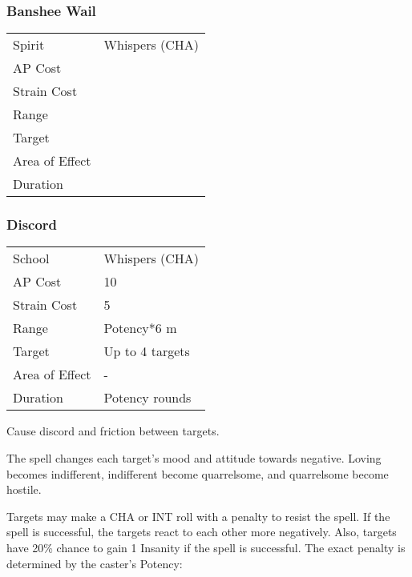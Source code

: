 \documentclass[11pt,a4paper,twocolumn]{book}
\begin{document}
\medskip

\subsubsection*{Banshee Wail}
{
	\begin{tabu} to 70mm{| X[l,4] | X[l,7] |}
		\hline
		Spirit         & Whispers (CHA) \\
		AP Cost        &                \\
		Strain Cost    &                \\
		Range          &                \\
		Target         &                \\
		Area of Effect &                \\
		Duration       &                \\ \hline
	\end{tabu}
	
}
\medskip


\subsubsection*{Discord}
{
	\begin{tabu} to 75mm{| X[l,4] | X[l,7] |}
		\hline
		School         & Whispers (CHA)  \\
		AP Cost        & 10              \\
		Strain Cost    & 5               \\
		Range          & Potency*6 m     \\
		Target         & Up to 4 targets \\
		Area of Effect & -               \\
		Duration       & Potency rounds  \\ \hline
	\end{tabu}
	
}

\medskip

Cause discord and friction between targets.

The spell changes each target's mood and attitude towards negative. Loving becomes indifferent, indifferent become quarrelsome, and quarrelsome become hostile.

Targets may make a CHA or INT roll with a penalty to resist the spell. If the spell is successful, the targets react to each other more negatively. Also, targets have 20\% chance to gain 1 Insanity if the spell is successful. The exact penalty is determined by the caster's Potency: 
\end{document}
